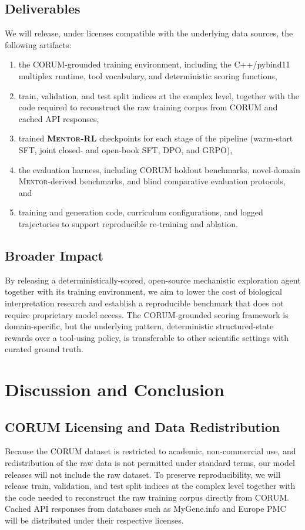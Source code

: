 \documentclass[thesis,letterpaper,12pt]{utthesis}
\begin{document}
\subsection{Deliverables}
We will release, under licenses compatible with the underlying data sources, the following artifacts:
\begin{enumerate}
    \item the CORUM-grounded training environment, including the C++/pybind11 multiplex runtime, tool vocabulary, and deterministic scoring functions,
    \item train, validation, and test split indices at the complex level, together with the code required to reconstruct the raw training corpus from CORUM and cached API responses,
    \item trained \textbf{\textsc{Mentor-RL}} checkpoints for each stage of the pipeline (warm-start SFT, joint closed- and open-book SFT, DPO, and GRPO),
    \item the evaluation harness, including CORUM holdout benchmarks, novel-domain \textsc{Mentor}-derived benchmarks, and blind comparative evaluation protocols, and
    \item training and generation code, curriculum configurations, and logged trajectories to support reproducible re-training and ablation.
\end{enumerate}

\subsection{Broader Impact}
By releasing a deterministically-scored, open-source mechanistic exploration agent together with its training environment, we aim to lower the cost of biological interpretation research and establish a reproducible benchmark that does not require proprietary model access. The CORUM-grounded scoring framework is domain-specific, but the underlying pattern, deterministic structured-state rewards over a tool-using policy, is transferable to other scientific settings with curated ground truth.

\section{Discussion and Conclusion}

\subsection{CORUM Licensing and Data Redistribution}
Because the CORUM dataset is restricted to academic, non-commercial use, and redistribution of the raw data is not permitted under standard terms, our model releases will not include the raw dataset. To preserve reproducibility, we will release train, validation, and test split indices at the complex level together with the code needed to reconstruct the raw training corpus directly from CORUM. Cached API responses from databases such as MyGene.info and Europe PMC will be distributed under their respective licenses.
\end{document}
